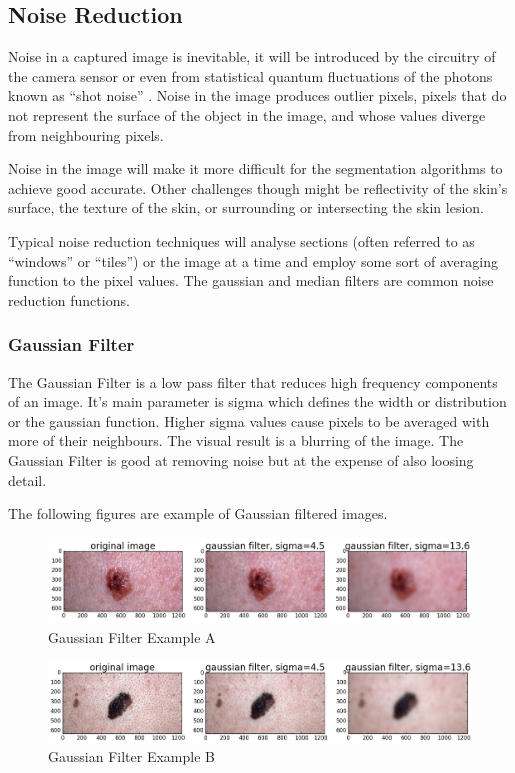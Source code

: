 \subsection{Noise Reduction}

Noise in a captured image is inevitable, it will be introduced by the circuitry of the camera sensor or even from statistical quantum fluctuations of the photons known as “shot noise” \cite{image_noise}.  Noise in the image produces outlier pixels, pixels that do not represent the surface of the object in the image, and whose values diverge from neighbouring pixels.

Noise in the image will make it more difficult for the segmentation algorithms to achieve good accurate. Other challenges though might be reflectivity of the skin’s surface, the texture of the skin, or surrounding or intersecting the skin lesion.

Typical noise reduction techniques will analyse sections (often referred to as “windows” or “tiles”) or the image at a time and employ some sort of averaging function to the pixel values. The gaussian and median filters are common noise reduction functions.

\subsubsection{Gaussian Filter}

The Gaussian Filter is a low pass filter that reduces high frequency components of an image. It's main parameter is sigma which defines the width or distribution or the gaussian function. Higher sigma values cause pixels to be averaged with more of their neighbours. The visual result is a blurring of the image. The Gaussian Filter is good at removing noise but at the expense of also loosing detail.

The following figures are example of Gaussian filtered images.

\begin{figure}[H]
    \includegraphics[width=\textwidth,keepaspectratio]{assets/image_processing/noise_reduction/gaussian/figure_01.png}
    \caption{Gaussian Filter Example A}
    \label{fig:med_A}
\end{figure}
\begin{figure}[H]
    \includegraphics[width=\textwidth,keepaspectratio]{assets/image_processing/noise_reduction/gaussian/figure_02.png}
    \caption{Gaussian Filter Example B}
    \label{fig:med_B}
\end{figure}

